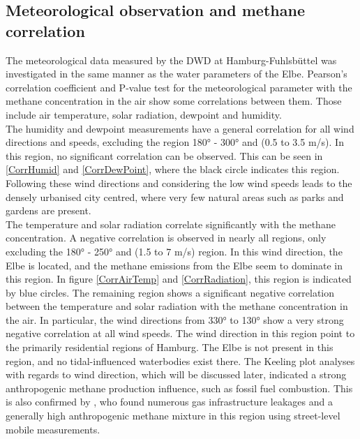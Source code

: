 \subsection{Meteorological observation and methane correlation}
The meteorological data measured by the DWD at Hamburg-Fuhlsbüttel \cite{DeutschenWetterdienst.20230501} was investigated in the same manner as the water parameters of the Elbe.
Pearson's correlation coefficient and P-value test for the meteorological parameter with the methane concentration in the air show some correlations between them. Those include air temperature, solar radiation, dewpoint and humidity.\\
The humidity and dewpoint measurements have a general correlation for all wind directions and speeds, excluding the region 180° - 300° and (0.5 to 3.5 m/s). In this region, no significant correlation can be observed. This can be seen in \cref{CorrHumid} and \cref{CorrDewPoint}, where the black circle indicates this region. Following these wind directions and considering the low wind speeds leads to the densely urbanised city centred, where very few natural areas such as parks and gardens are present.\\
The temperature and solar radiation correlate significantly with the methane concentration. A negative correlation is observed in nearly all regions, only excluding the 180° - 250° and (1.5 to 7 m/s) region. In this wind direction, the Elbe is located, and the methane emissions from the Elbe seem to dominate in this region. In figure \cref{CorrAirTemp} and \cref{CorrRadiation}, this region is indicated by blue circles.
The remaining region shows a significant negative correlation between the temperature and solar radiation with the methane concentration in the air. In particular, the wind directions from 330° to 130° show a very strong negative correlation at all wind speeds. The wind direction in this region point to the primarily residential regions of Hamburg. The Elbe is not present in this region, and no tidal-influenced waterbodies exist there. The Keeling plot analyses with regards to wind direction, which will be discussed later, indicated a strong anthropogenic methane production influence, such as fossil fuel combustion. This is also confirmed by \cite{Maazallahi.2020}, who found numerous gas infrastructure leakages and a generally high anthropogenic methane mixture in this region using street-level mobile measurements. 
